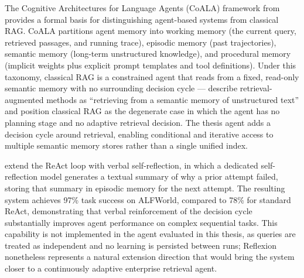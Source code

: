 The Cognitive Architectures for Language Agents (CoALA) framework from  provides a formal basis for distinguishing agent-based systems from classical RAG. CoALA partitions agent memory into working memory (the current query, retrieved passages, and running trace), episodic memory (past trajectories), semantic memory (long-term unstructured knowledge), and procedural memory (implicit weights plus explicit prompt templates and tool definitions). Under this taxonomy, classical RAG is a constrained agent that reads from a fixed, read-only semantic memory with no surrounding decision cycle —  describe retrieval-augmented methods as ``retrieving from a semantic memory of unstructured text'' and position classical RAG as the degenerate case in which the agent has no planning stage and no adaptive retrieval decision. The thesis agent adds a decision cycle around retrieval, enabling conditional and iterative access to multiple semantic memory stores rather than a single unified index.

 extend the ReAct loop with verbal self-reflection, in which a dedicated self-reflection model generates a textual summary of why a prior attempt failed, storing that summary in episodic memory for the next attempt. The resulting system achieves 97\% task success on ALFWorld, compared to 78\% for standard ReAct, demonstrating that verbal reinforcement of the decision cycle substantially improves agent performance on complex sequential tasks. This capability is not implemented in the agent evaluated in this thesis, as queries are treated as independent and no learning is persisted between runs; Reflexion nonetheless represents a natural extension direction that would bring the system closer to a continuously adaptive enterprise retrieval agent.

